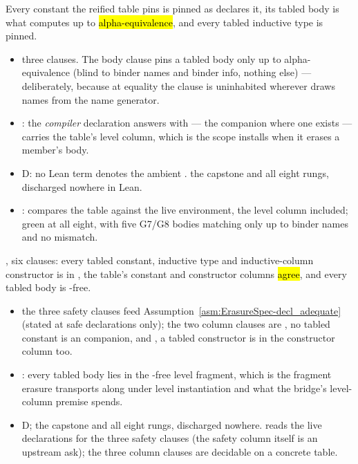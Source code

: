 \begin{assumption}
\label{asm:htbl}
\stAssumed{}  Every constant the reified table  pins is pinned as
 declares it, its tabled body is what  computes up to
\hl{alpha-equivalence}, and every tabled inductive type is pinned.
\begin{itemize}
\item {} three clauses. The body clause pins a tabled body only up to alpha-equivalence
(blind to binder names and binder info, nothing else) --- deliberately, because at equality the
clause is uninhabited wherever  draws  names from the name
generator.
\item {}: the \emph{compiler} declaration  answers with ---
the  companion where one exists --- carries the table's level column, which is
the scope  installs when it erases a member's body.
\item {} D: no Lean term denotes the ambient . 
the capstone and all eight rungs, discharged nowhere in Lean.
\item {}:  compares the table against the
live environment, the level column included; green at all eight, with five G7/G8 bodies matching
only up to binder names and no mismatch.
\end{itemize}
\end{assumption}

\begin{assumption}
\label{asm:hsafe}
\stAssumed{}  , six clauses: every tabled constant,
inductive type and inductive-column constructor is  in , the table's
constant and constructor columns \hl{agree}, and every tabled body is -free.
\begin{itemize}
\item {} the three safety clauses feed Assumption~\ref{asm:ErasureSpec-decl_adequate}
(stated at safe declarations only); the two column clauses are , no tabled
constant is an  companion, and , a tabled constructor is in the
constructor column too.
\item {}: every tabled body lies in the -free level fragment, which is
the fragment erasure transports along under level instantiation and what the bridge's level-column
premise spends.
\item {} D;  the capstone and all eight rungs, discharged nowhere.
 reads the live declarations for the three safety clauses (the safety
column itself is an upstream ask); the three column clauses are decidable on a concrete table.
\end{itemize}
\end{assumption}

